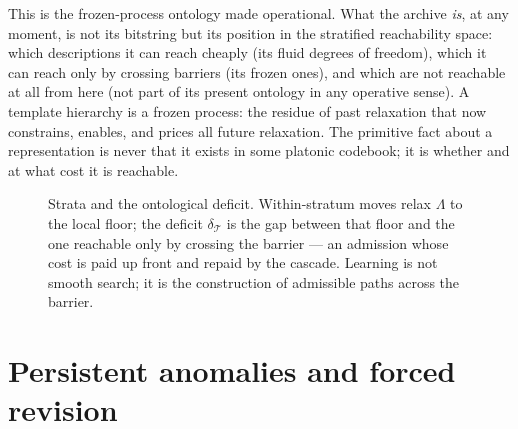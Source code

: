 \documentclass[11pt,oneside]{book}
\theoremstyle{remark}
\newcommand{\Tem}{\mathcal{T}}
\begin{document}
This is the frozen-process ontology made operational. What the archive
\emph{is}, at any moment, is not its bitstring but its position in the
stratified reachability space: which descriptions it can reach cheaply
(its fluid degrees of freedom), which it can reach only by crossing
barriers (its frozen ones), and which are not reachable at all from
here (not part of its present ontology in any operative sense). A
template hierarchy is a frozen process: the residue of past relaxation
that now constrains, enables, and prices all future relaxation. The
primitive fact about a representation is never that it exists in some
platonic codebook; it is whether and at what cost it is reachable.

\begin{figure}[ht]
\centering
{}
\caption{Strata and the ontological deficit. Within-stratum moves
relax $\Lambda$ to the local floor; the deficit $\delta_{\Tem}$ is the
gap between that floor and the one reachable only by crossing the
barrier --- an admission whose cost is paid up front and repaid by the
cascade. Learning is not smooth search; it is the construction of
admissible paths across the barrier.}
\label{fig:strata}
\end{figure}

\section{Persistent anomalies and forced revision}
\end{document}
